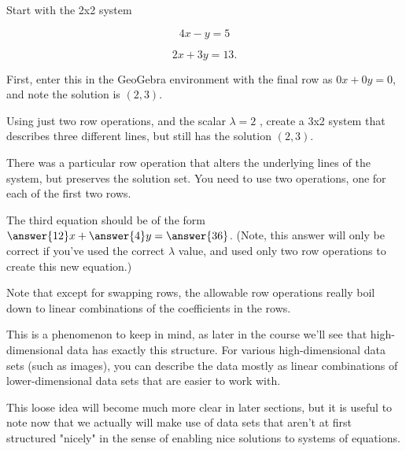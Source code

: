 \documentclass{ximera}
\begin{document}
    \begin{example}
    
        Start with the 2x2 system 
    
        $$4x-y=5$$
    
        $$2x+3y=13.$$
    
        First, enter this in the GeoGebra environment with the final row as $0x+0y=0$, and note the solution is $(2,3)$.
    
        Using just two row operations, and the scalar %
        $\lambda=2$
        , create a 3x2 system that describes three different lines, but still has the solution $(2,3)$.
    
        \begin{remark}
    
            There was a particular row operation that alters the underlying lines of the system, but preserves the solution set. You need to use two operations, one for each of the first two rows.
    
        \end{remark}
    
        The third equation should be of the form $\answer{12}x+\answer{4}y=\answer{36}$.
        (Note, this answer will only be correct if you've used the correct $\lambda$ value, and used only two row operations to create this new equation.)
    
    
    \end{example}
    
    \begin{remark}
    
        Note that except for swapping rows, the allowable row operations really boil down to linear combinations of the coefficients in the rows.
    
        This is a phenomenon to keep in mind, as later in the course we'll see that high-dimensional data has exactly this structure. For various high-dimensional data sets (such as images), you can describe the data mostly as linear combinations of lower-dimensional data sets that are easier to work with. 
        
        This loose idea will become much more clear in later sections, but it is useful to note now that we actually will make use of data sets that aren't at first structured "nicely" in the sense of enabling nice solutions to systems of equations.
    
    \end{remark}
    
\end{document}
